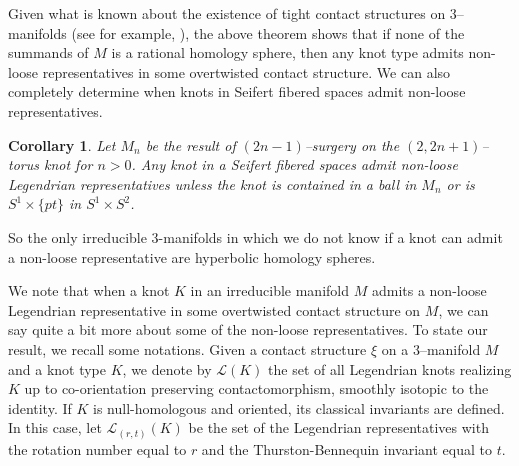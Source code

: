 \documentclass[11pt]{amsart}
\theoremstyle{plain}
\newtheorem{corollary}[theorem]{Corollary}
\theoremstyle{definition}
\theoremstyle{remark}
\numberwithin{theorem}{section}
\begin{document}
Given what is known about the existence of tight contact structures on $3$--manifolds ({see for example, }\cite{EliashbergThurston96}), the above theorem shows that if none of the summands of $M$ is a rational homology sphere, then any knot type admits non-loose representatives in some overtwisted contact structure. We can also completely determine when knots in Seifert fibered spaces admit non-loose representatives. 
\begin{corollary}\label{maincor}
Let $M_n$ be the result of $(2n-1)$--surgery on the $(2,2n+1)$--torus knot for $n>0$. Any knot in a Seifert fibered spaces admit non-loose Legendrian representatives unless the knot is contained in a ball in $M_n$ or is $S^1\times \{pt\}$ in $S^1\times S^2$.  
\end{corollary}

So the only irreducible $3$-manifolds in which we do not know if a knot can admit a non-loose representative are hyperbolic homology spheres. 

We note that when a knot $K$ in an irreducible manifold $M$ admits a non-loose Legendrian representative in some overtwisted contact structure on $M$, we can say quite a bit more about some of the non-loose representatives. To state our result, we recall some notations. Given a contact structure $\xi$ on a $3$--manifold $M$ and a knot type $K$, we denote by $\mathcal{L}(K)$ the set of all Legendrian knots realizing $K$ up to co-orientation preserving contactomorphism, smoothly isotopic to the identity. If $K$ is null-homologous and oriented, its classical invariants are defined. In this case, let $\mathcal{L}_{(r,t)}(K)$ be the set of the Legendrian representatives with the rotation number equal to $r$ and the Thurston-Bennequin invariant equal to $t$. 
\end{document}
